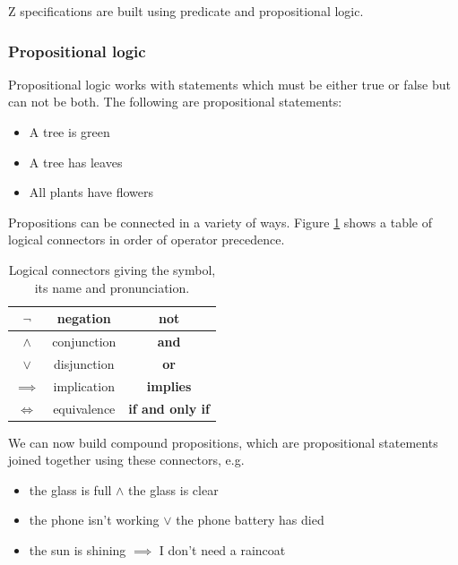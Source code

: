 Z specifications are built using predicate and propositional logic.

\subsubsection{Propositional logic}

Propositional logic works with statements which must be either true or false but can not be both. The following are propositional statements:
\begin{itemize}
\item A tree is green

\item A tree has leaves

\item All plants have flowers
\end{itemize}

Propositions can be connected in a variety of ways. Figure \ref{tab:logcon} shows a table of logical connectors in order of operator precedence.

\begin{table}[H]
\centering
\begin{tabular}{| c | c | c |}
\hline
$\neg$ & negation & \textbf{not} \\
\hline
$\land$ & conjunction & \textbf{and} \\
\hline
$\lor$ & disjunction & \textbf{or} \\
\hline
$\implies$ & implication & \textbf{implies} \\
\hline
$\Leftrightarrow$ & equivalence & \textbf{if and only if} \\
\hline
\end{tabular}
\caption{Logical connectors giving the symbol, its name and pronunciation. \label{tab:logcon}}
\end{table}

We can now build compound propositions, which are propositional statements joined together using these connectors, e.g.

\begin{itemize}
\item the glass is full $\land$ the glass is clear

\item the phone isn't working $\lor$ the phone battery has died

\item the sun is shining $\implies$ I don't need a raincoat
\end{itemize}

